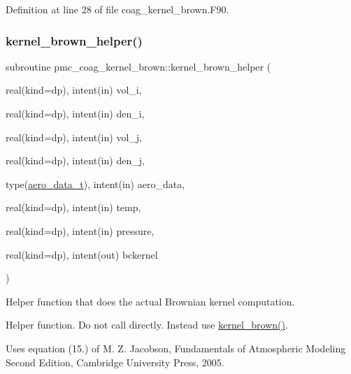 Definition at line 28 of file coag\+\_\+kernel\+\_\+brown.\+F90.

\mbox{\label{namespacepmc__coag__kernel__brown_af427aeba502e7eb29067289245b3515f}} 
\subsubsection{\texorpdfstring{kernel\+\_\+brown\+\_\+helper()}{kernel\_brown\_helper()}}
{\footnotesize\ttfamily subroutine pmc\+\_\+coag\+\_\+kernel\+\_\+brown\+::kernel\+\_\+brown\+\_\+helper (\begin{DoxyParamCaption}\item[{real(kind=dp), intent(in)}]{vol\+\_\+i,  }\item[{real(kind=dp), intent(in)}]{den\+\_\+i,  }\item[{real(kind=dp), intent(in)}]{vol\+\_\+j,  }\item[{real(kind=dp), intent(in)}]{den\+\_\+j,  }\item[{type(\mbox{\hyperlink{structpmc__aero__data_1_1aero__data__t}{aero\+\_\+data\+\_\+t}}), intent(in)}]{aero\+\_\+data,  }\item[{real(kind=dp), intent(in)}]{temp,  }\item[{real(kind=dp), intent(in)}]{pressure,  }\item[{real(kind=dp), intent(out)}]{bckernel }\end{DoxyParamCaption})}



Helper function that does the actual Brownian kernel computation. 

Helper function. Do not call directly. Instead use \mbox{\hyperlink{namespacepmc__coag__kernel__brown_a88a16189fef47e9f6fdb1f8c5ad6030a}{kernel\+\_\+brown()}}.

Uses equation (15.) of M. Z. Jacobson, Fundamentals of Atmospheric Modeling Second Edition, Cambridge University Press, 2005.


